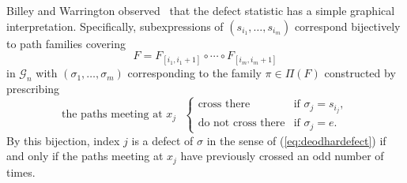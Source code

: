 \documentclass[12pt]{amsart}
\theoremstyle{definition}
\numberwithin{equation}{section}
\newcommand{\sn}{\mathfrak{S}_n}
\newcommand{\hanq}{H_n^{\msfA}(q)}
\newcommand{\ctr}[1]{{x}_{#1}}
\newcommand{\net}[1]{\mathcal G_{#1}}
\newcommand{\msfA}{\mathsf{A}}
\begin{document}
Billey and Warrington observed~\cite[Rmk.\,6]{BWHex}
that 
the defect statistic has a simple graphical interpretation.
Specifically, subexpressions 
of $(s_{i_1},\dotsc,s_{i_m})$ correspond bijectively to path families
covering 
\begin{equation}\label{eq:wirediagprod}
F =
F_{[i_1,i_1+1]} \circ \cdots \circ F_{[i_m,i_m+1]} 
\end{equation}
in $\net n$ with 
$(\sigma_1,\dotsc,\sigma_m)$ corresponding 
to the family $\pi \in \Pi(F)$
constructed by prescribing %
\begin{equation*}
\text{the paths meeting at $\ctr j$ }
\begin{cases}
    \text{cross there} &\text{if $\sigma_j = s_{i_j}$},\\
    \text{do not cross there} &\text{if $\sigma_j = e$}.
    \end{cases}
\end{equation*}
By this bijection, index $j$ is a defect of $\sigma$ in the sense of (\ref{eq:deodhardefect}) if and only if the paths meeting at $\ctr j$
have previously crossed an odd number of times.
\end{document}
